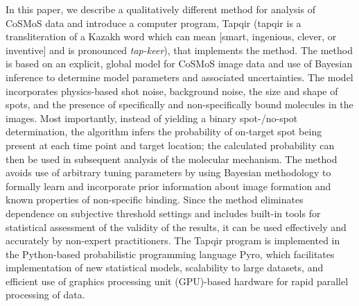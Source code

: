 In this paper, we describe a qualitatively different method for analysis of CoSMoS data and introduce a computer program, Tapqir (tapqir is a transliteration of a Kazakh word which can mean [smart, ingenious, clever, or inventive] and is pronounced \emph{tap-keer}), that implements the method. The method is based on an explicit, global model for CoSMoS image data and use of Bayesian inference to determine model parameters and associated uncertainties. The model incorporates physics-based shot noise, background noise, the size and shape of spots, and the presence of specifically and non-specifically bound molecules in the images. Most importantly, instead of yielding a binary spot-/no-spot determination, the algorithm infers the probability of on-target spot being present at each time point and target location; the calculated probability can then be used in subsequent analysis of the molecular mechanism. The method avoids use of arbitrary tuning parameters by using Bayesian methodology to formally learn and incorporate prior information about image formation and known properties of non-specific binding.  Since the method eliminates dependence on subjective threshold settings and includes built-in tools for statistical assessment of the validity of the results, it can be used effectively and accurately by non-expert practitioners. The Tapqir program is implemented in the Python-based probabilistic programming language Pyro, which facilitates implementation of new statistical models, scalability to large datasets, and efficient use of graphics processing unit (GPU)-based hardware for rapid parallel processing of data. 